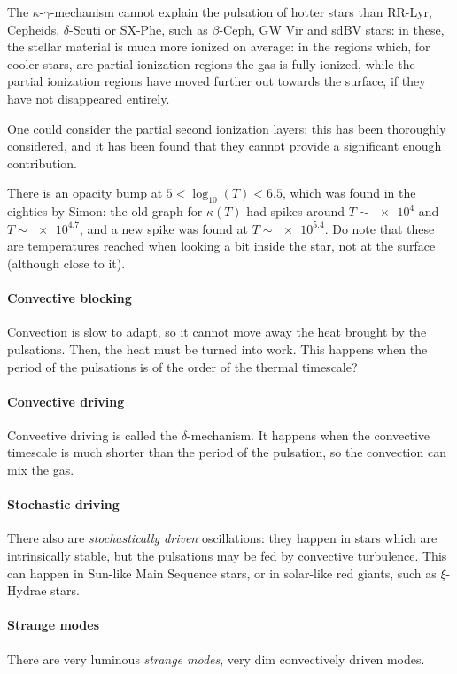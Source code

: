 \documentclass[main.tex]{subfiles}
\begin{document}
The \(\kappa \)-\(\gamma \)-mechanism cannot explain the pulsation of hotter stars than RR-Lyr, Cepheids, \(\delta \)-Scuti or SX-Phe, such as \(\beta\)-Ceph, GW Vir and sdBV stars: in these, the stellar material is much more ionized on average: in the regions which, for cooler stars, are partial ionization regions the gas is fully ionized, while the partial ionization regions have moved further out towards the surface, if they have not disappeared entirely.

One could consider the partial second ionization layers: this has been thoroughly considered, and it has been found that they cannot provide a significant enough contribution.

There is an opacity bump at \(5<\log_{10}(T)< 6.5 \), which was found in the eighties by Simon: the old graph for \(\kappa (T)\) had spikes around \(T \sim \num{e4}\) and \(T \sim \num{e4.7}\), and a new spike was found at \(T \sim \num{e5.4}\). 
Do note that these are temperatures reached when looking a bit inside the star, not at the surface (although close to it).

\paragraph{Convective blocking}
Convection is slow to adapt, so it cannot move away the heat brought by the pulsations. Then, the heat must be turned into work. 
This happens when the period of the pulsations is of the order of the thermal timescale?

\paragraph{Convective driving}
Convective driving is called the \(\delta \)-mechanism.
It happens when the convective timescale is much shorter than the period of the pulsation, so the convection can mix the gas. 

\paragraph{Stochastic driving}
There also are \emph{stochastically driven} oscillations: they happen in stars which are intrinsically stable, but the pulsations may be fed by convective turbulence. 
This can happen in Sun-like Main Sequence stars, or in solar-like red giants, such as \(\xi \)-Hydrae stars.

\paragraph{Strange modes}
There are very luminous \emph{strange modes}, very dim convectively driven modes.
\end{document}
